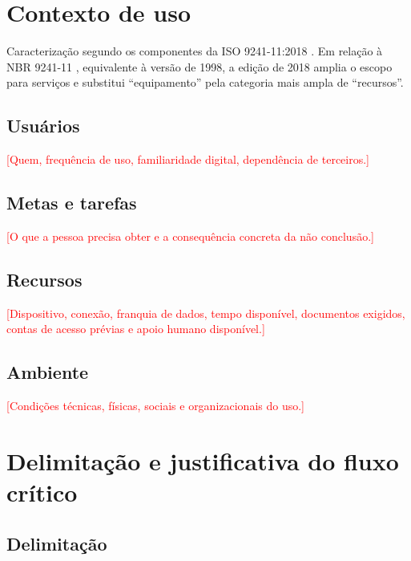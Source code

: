 \documentclass[
  12pt,
  oneside,
  a4paper,
  chapter=TITLE,
  section=TITLE,
  english,
  brazil
]{abntex2}
\newcommand{\preencher}[1]{\textcolor{red}{[#1]}}
\begin{document}
\chapter{Contexto de uso}\label{cap:contexto}

Caracterização segundo os componentes da ISO 9241-11:2018 \cite{iso9241-11-2018}.
Em relação à NBR 9241-11 \cite{nbr9241-11}, equivalente à versão de 1998, a
edição de 2018 amplia o escopo para serviços e substitui ``equipamento'' pela
categoria mais ampla de ``recursos''.

\section{Usuários}
\preencher{Quem, frequência de uso, familiaridade digital, dependência de terceiros.}

\section{Metas e tarefas}
\preencher{O que a pessoa precisa obter e a consequência concreta da não conclusão.}

\section{Recursos}
\preencher{Dispositivo, conexão, franquia de dados, tempo disponível, documentos
exigidos, contas de acesso prévias e apoio humano disponível.}

\section{Ambiente}
\preencher{Condições técnicas, físicas, sociais e organizacionais do uso.}

\chapter{Delimitação e justificativa do fluxo crítico}\label{cap:fluxo}

\section{Delimitação}
\end{document}
